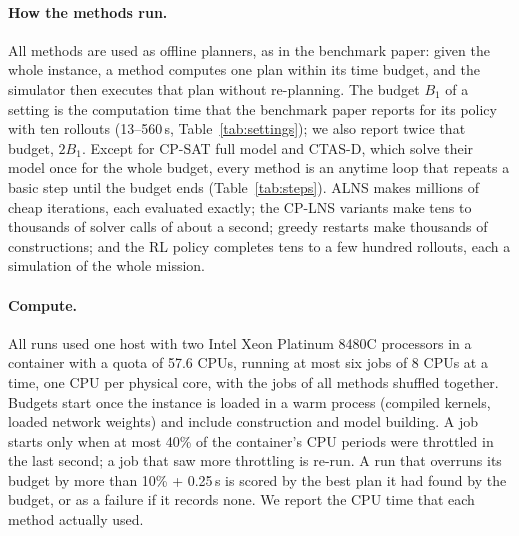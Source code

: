 

\paragraph{How the methods run.} All methods are used as offline planners, as in the benchmark paper: given the whole
instance, a method computes one plan within its time budget, and the simulator then executes that plan without
re-planning. The budget $B_1$ of a setting is the computation time that the benchmark paper reports for its policy
with ten rollouts (13--560\,s, Table~\ref{tab:settings}); we also report twice that budget, $2B_1$. Except for CP-SAT
full model and CTAS-D, which solve their model once for the whole budget, every method is an anytime loop that repeats
a basic step until the budget ends (Table~\ref{tab:steps}). ALNS makes millions of cheap iterations, each evaluated
exactly; the CP-LNS variants make tens to thousands of solver calls of about a second; greedy restarts make thousands
of constructions; and the RL policy completes tens to a few hundred rollouts, each a simulation of the whole mission.

\paragraph{Compute.} All runs used one host with two Intel Xeon Platinum 8480C processors in a container with a quota
of 57.6 CPUs, running at most six jobs of 8 CPUs at a time, one CPU per physical core, with the jobs of all methods
shuffled together. Budgets start once the instance is loaded in a warm process (compiled kernels, loaded network
weights) and include construction and model building. A job starts only when at most 40\% of the container's CPU periods
were throttled in the last second; a job that saw more throttling is re-run. A run that overruns its budget by more
than 10\% + 0.25\,s is scored by the best plan it had found by the budget, or as a failure if it records none. We
report the CPU time that each method actually used.

